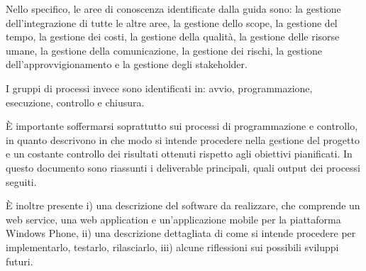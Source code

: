 Nello specifico, le aree di conoscenza identificate dalla guida sono: la gestione dell\rq integrazione di tutte le altre aree, la gestione dello scope, la gestione del tempo, la gestione dei costi, la gestione della qualit\`{a}, la gestione delle risorse umane, la gestione della comunicazione, la gestione dei rischi, la gestione dell\rq approvvigionamento e la gestione degli stakeholder. 

I gruppi di processi invece sono identificati in: avvio, programmazione, esecuzione, controllo e chiusura. 

\`{E} importante soffermarsi soprattutto sui processi di programmazione e controllo, in quanto descrivono in che modo si intende procedere nella gestione del progetto e un costante controllo dei risultati ottenuti rispetto agli obiettivi pianificati. In questo documento sono riassunti i deliverable principali, quali output dei processi seguiti.

\`{E} inoltre presente i) una descrizione del software da realizzare, che comprende un web service, una web application e un\rq applicazione mobile per la piattaforma Windows Phone, ii) una descrizione dettagliata di come si intende procedere per implementarlo, testarlo, rilasciarlo, iii) alcune riflessioni sui possibili sviluppi futuri.